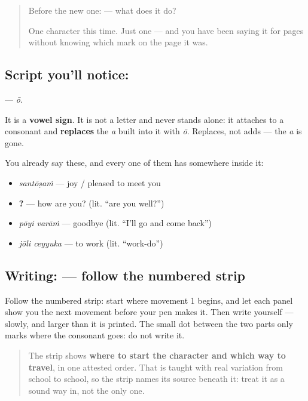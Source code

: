 \label{lesson:ML-S119-vowel-sign-oo}



\begin{quote}
Before the new one:  — what does it do?

One character this time. Just one — and you have been saying it for pages without knowing which mark on the page it was.
\end{quote}

\subsection*{Script you'll notice: }
\textbf{} — \emph{ō}.

It is a \textbf{vowel sign}. It is not a letter and never stands alone: it attaches to a consonant and \textbf{replaces} the \emph{a} built into it with \emph{ō}. Replaces, not adds — the \emph{a} is gone.

You already say these, and every one of them has  somewhere inside it:

\begin{itemize}
\raggedright
  \item \textbf{} \emph{santōṣaṁ} — joy / pleased to meet you
  \item \textbf{?} — how are you? (lit. \textquotedblleft{}are you well?\textquotedblright{})
  \item \textbf{ } \emph{pōyi varāṁ} — goodbye (lit. \textquotedblleft{}I'll go and come back\textquotedblright{})
  \item \textbf{ } \emph{jōli ceyyuka} — to work (lit. \textquotedblleft{}work-do\textquotedblright{})
\end{itemize}

\subsection*{Writing:  — follow the numbered strip}

Follow the numbered strip: start where movement 1 begins, and let each panel show you the next movement before your pen makes it. Then write  yourself — slowly, and larger than it is printed. The small dot between the two parts only marks where the consonant goes: do not write it.

\begin{quote}
The strip shows \textbf{where to start the character and which way to travel}, in one attested order. That is taught with real variation from school to school, so the strip names its source beneath it: treat it as a sound way in, not the only one.
\end{quote}

